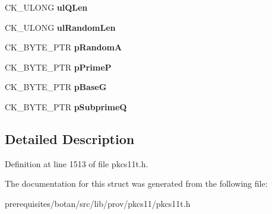 \begin{DoxyCompactItemize}
\item 
\mbox{\label{struct_c_k___s_k_i_p_j_a_c_k___p_r_i_v_a_t_e___w_r_a_p___p_a_r_a_m_s_a15e8b5788e371e4b4e6e0676101be7fa}} 
C\+K\+\_\+\+U\+L\+O\+NG {\bfseries ul\+Q\+Len}
\item 
\mbox{\label{struct_c_k___s_k_i_p_j_a_c_k___p_r_i_v_a_t_e___w_r_a_p___p_a_r_a_m_s_aef961ec9cc230498bbd6524f3d280d72}} 
C\+K\+\_\+\+U\+L\+O\+NG {\bfseries ul\+Random\+Len}
\item 
\mbox{\label{struct_c_k___s_k_i_p_j_a_c_k___p_r_i_v_a_t_e___w_r_a_p___p_a_r_a_m_s_aecf7dc559fa0698e185e16f0f3eda3c9}} 
C\+K\+\_\+\+B\+Y\+T\+E\+\_\+\+P\+TR {\bfseries p\+RandomA}
\item 
\mbox{\label{struct_c_k___s_k_i_p_j_a_c_k___p_r_i_v_a_t_e___w_r_a_p___p_a_r_a_m_s_ab3529baced3561dfdbf016ff59f9c3bf}} 
C\+K\+\_\+\+B\+Y\+T\+E\+\_\+\+P\+TR {\bfseries p\+PrimeP}
\item 
\mbox{\label{struct_c_k___s_k_i_p_j_a_c_k___p_r_i_v_a_t_e___w_r_a_p___p_a_r_a_m_s_a465420717f684f591fc9b1baec860528}} 
C\+K\+\_\+\+B\+Y\+T\+E\+\_\+\+P\+TR {\bfseries p\+BaseG}
\item 
\mbox{\label{struct_c_k___s_k_i_p_j_a_c_k___p_r_i_v_a_t_e___w_r_a_p___p_a_r_a_m_s_ae1a258ddf445abd2b00627f063eba7b3}} 
C\+K\+\_\+\+B\+Y\+T\+E\+\_\+\+P\+TR {\bfseries p\+SubprimeQ}
\end{DoxyCompactItemize}


\subsection{Detailed Description}


Definition at line 1513 of file pkcs11t.\+h.



The documentation for this struct was generated from the following file\+:\begin{DoxyCompactItemize}
\item 
prerequisites/botan/src/lib/prov/pkcs11/pkcs11t.\+h\end{DoxyCompactItemize}
